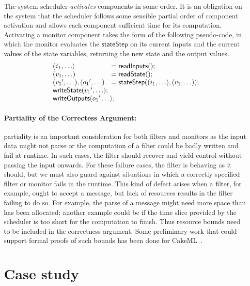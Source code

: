\documentclass[global,twocolumn]{svjour}
\newcommand{\konst}[1]{\ensuremath{\mathsf{#1}}}
\newcommand{\ckml}{CakeML}
\begin{document}
The system scheduler \emph{activates} components in some order.
%
It is an obligation on the system that the scheduler follows some sensible partial order of component activation and allows each component sufficient time for its computation.
%
Activating a monitor component takes the form of the following pseudo-code, in which the monitor evaluates the \konst{stateStep} on its current inputs and the current values of the state variables, returning the new state and the output values.
%
\[
\begin{array}{ll}
 \mathit{(i_1,\ldots)} & = \konst{readInputs}(); \\
 (v_1,\ldots) & = \konst{readState}() ; \\
 ({v_1}',\ldots), ({o_1}',\ldots) & = \konst{stateStep} ((i_1,\ldots),(v_1,\ldots)) ; \\
 \multicolumn{2}{l}{\konst{writeState}({v_1}',\ldots);} \\
 \multicolumn{2}{l}{\konst{writeOutputs}({o_1}'\ldots);} \\
\end{array}
\]


\paragraph{Partiality of the Correctess Argument:\/} partiality is an important consideration for both filters and monitors as the input data might not parse or the computation of a filter could be badly written and fail at runtime.
%
In such cases, the filter should recover and yield control without passing the input onwards.
%
For these failure cases, the filter is behaving as it should, but we must also guard against situations in which a correctly specified filter or monitor fails in the runtime.
%
This kind of defect arises when a filter, for example, ought to accept a message, but lack of resources results in the filter failing to do so.
%
For example, the parse of a message might need more space than has been allocated;
%
another example could be if the time slice provided by the scheduler is too short for the computation to finish.
%
Thus resource bounds need to be included in the correctness argument.
%
Some preliminary work that could support formal proofs of such bounds has been done for \ckml\ \cite{cakeml-space-cost}.


\section{Case study}
\label{sec:case-study}
\end{document}

